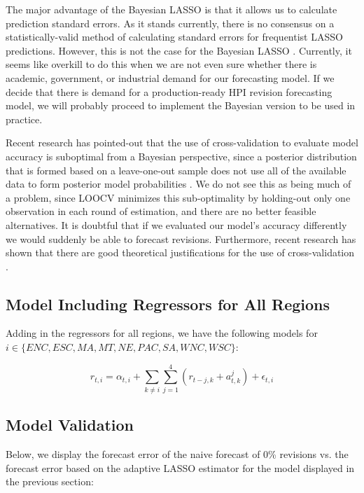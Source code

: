 \documentclass[AER]{AEA}
\begin{document}
The major advantage of the Bayesian LASSO is that it allows us to calculate prediction standard errors. As it stands currently, there is no consensus on a statistically-valid method of calculating standard errors for frequentist LASSO predictions. However, this is not the case for the Bayesian LASSO  \cite{BayesLASSOSE}. Currently, it seems like overkill to do this when we are not even sure whether there is academic, government, or industrial demand for our forecasting model. If we decide that there is demand for a production-ready HPI revision forecasting model, we will probably proceed to implement the Bayesian version to be used in practice.

Recent research has pointed-out that the use of cross-validation to evaluate model accuracy is suboptimal from a Bayesian perspective, since a posterior distribution that is formed based on a leave-one-out sample does not use all of the available data to form posterior model probabilities \cite{useOfHoldOut}. We do not see this as being much of a problem, since LOOCV minimizes this sub-optimality by holding-out only one observation in each round of estimation, and there are no better feasible alternatives. It is doubtful that if we evaluated our model's accuracy differently we would suddenly be able to forecast revisions. Furthermore, recent research has shown that there are good theoretical justifications for the use of cross-validation \cite{useOfHoldOut}. 

\subsection{Model Including Regressors for All Regions}

Adding in the regressors for all regions, we have the following models for $i \in \lbrace ENC,ESC,MA,MT,NE,PAC,SA,WNC,WSC \rbrace$:

\[
r_{t,i} = \alpha_{t,i} + \sum_{k \neq i} \sum_{j=1}^4 \left( r_{t-j,k} + a_{t,k}^j \right) + \epsilon_{t,i}
\]

\subsection{Model Validation}

Below, we display the forecast error of the naive forecast of 0\% revisions vs. the forecast error based on the adaptive LASSO estimator for the model displayed in the previous section:
\end{document}
